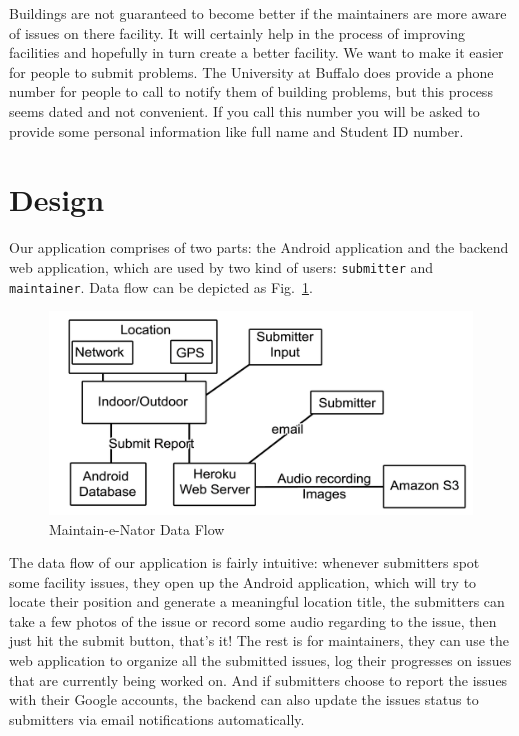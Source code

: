 \documentclass{acm_proc_article-sp}
\begin{document}
Buildings are not guaranteed to become better if the maintainers are more aware of issues on there facility. It will certainly help in the process of improving 
facilities and hopefully in turn create a better facility. We want to make it easier for people to submit problems. The University at Buffalo does provide a phone
number for people to call to notify them of building problems, but this process seems dated and not convenient. If you call this number you will be asked to provide
some personal information like full name and Student ID number.

\section{Design}
Our application comprises of two parts: the Android application and the backend web application, which are used by two kind of users:
\texttt{submitter} and \texttt{maintainer}. Data flow can be depicted as Fig.~\ref{fig:diagram}.
\begin{figure}
\centering
\includegraphics[scale=0.1]{images/diagram.png}
\caption{Maintain-e-Nator Data Flow}\label{fig:diagram}
\end{figure}
The data flow of our application is fairly intuitive: whenever submitters spot some facility issues, they open up the Android application, which will
try to locate their position and generate a meaningful location title, the submitters can take a few photos of the issue or record some audio regarding to
the issue, then just hit the submit button, that's it! The rest is for maintainers, they can use the web application to organize all the submitted issues,
log their progresses on issues that are currently being worked on. And if submitters choose to report the issues with their Google accounts, the backend can also update
the issues status to submitters via email notifications automatically.
\end{document}
